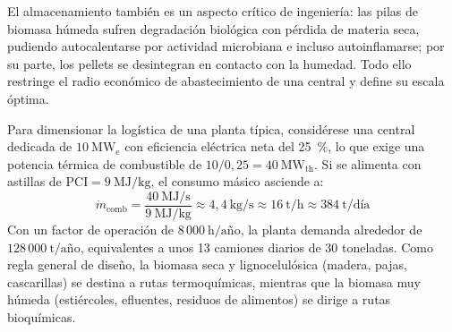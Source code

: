 El almacenamiento también es un aspecto crítico de ingeniería: las pilas de biomasa húmeda sufren degradación biológica con pérdida de materia seca, pudiendo autocalentarse por actividad microbiana e incluso autoinflamarse; por su parte, los pellets se desintegran en contacto con la humedad. Todo ello restringe el radio económico de abastecimiento de una central y define su escala óptima.

Para dimensionar la logística de una planta típica, considérese una central dedicada de $10~\mathrm{MW_e}$ con eficiencia eléctrica neta del 25~\%, lo que exige una potencia térmica de combustible de $10 / 0{,}25 = 40~\mathrm{MW_{th}}$. Si se alimenta con astillas de $\mathrm{PCI} = 9~\text{MJ/kg}$, el consumo másico asciende a:
\begin{equation*}
\dot{m}_{\mathrm{comb}} = \frac{40~\text{MJ/s}}{9~\text{MJ/kg}} \approx 4{,}4~\text{kg/s} \approx 16~\text{t/h} \approx 384~\text{t/día}
\end{equation*}
Con un factor de operación de $8\,000~\text{h/año}$, la planta demanda alrededor de $128\,000~\text{t/año}$, equivalentes a unos 13 camiones diarios de 30 toneladas. Como regla general de diseño, la biomasa seca y lignocelulósica (madera, pajas, cascarillas) se destina a rutas termoquímicas, mientras que la biomasa muy húmeda (estiércoles, efluentes, residuos de alimentos) se dirige a rutas bioquímicas.
